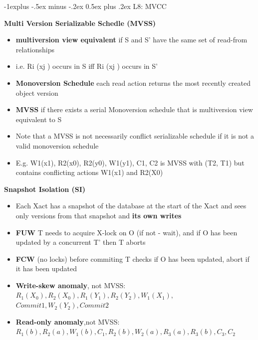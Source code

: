 \documentclass[10pt, landscape]{article}
\makeatletter
\renewcommand{\subsection}{\@startsection{subsection}{2}{0mm}%
                                {-1explus -.5ex minus -.2ex}%
                                {0.5ex plus .2ex}%
                                {\normalfont\normalsize\bfseries}}
\makeatother
\begin{document}
\begin{multicols}{4}
\subsection{L8: MVCC}

\textbf{Multi Version Serializable Schedle (MVSS)} \\
\begin{itemize}
  \item \textbf{multiversion view equivalent} if S and S' have the same set of read-from relationships
  \item i.e. Ri (xj ) occurs in S iff Ri (xj ) occurs in S'
  \item \textbf{Monoversion Schedule} each read action returns the most recently created object version
  \item \textbf{MVSS} if there exists a serial Monoversion schedule that is multiversion view equivalent to S
  \item Note that a MVSS is not necessarily conflict serializable schedule if it is not a valid monoversion schedule
  \item E.g. W1(x1), R2(x0), R2(y0), W1(y1), C1, C2 is MVSS with (T2, T1) but contains conflicting actions W1(x1) and R2(X0)
\end{itemize}

\textbf{Snapshot Isolation (SI)} \\
\begin{itemize}
  \item Each Xact has a snapshot of the database at the start of the Xact and sees only versions from that snapshot and \textbf{its own writes}
  \item \textbf{FUW} T needs to acquire X-lock on O (if not - wait), and if O has been updated by a concurrent T' then T aborts
  \item \textbf{FCW} (no locks) before commiting T checks if O has been updated, abort if it has been updated
  \item \textbf{Write-skew anomaly}, not MVSS: $R_1(X_0), R_2(X_0), R_1(Y_1), R_2(Y_2), W_1(X_1),$ $ Commit1, W_2(Y_2), Commit2$
  \item \textbf{Read-only anomaly},not MVSS: $R_1(b), R_2(a), W_1(b), C_1, R_2(b), W_2(a),R_3(a), R_3(b), C_3, C_2$
\end{itemize}


\end{multicols}
\end{document}
